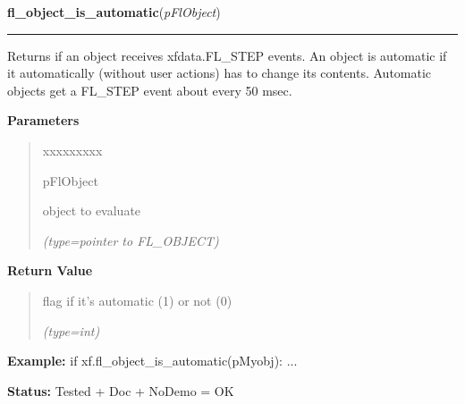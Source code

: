\hspace{.8\funcindent}\begin{boxedminipage}{\funcwidth}

    \raggedright \textbf{fl\_object\_is\_automatic}(\textit{pFlObject})

    \vspace{-1.5ex}

    \rule{\textwidth}{0.5\fboxrule}
\setlength{\parskip}{2ex}
    Returns if an object receives xfdata.FL\_STEP events. An object is 
    automatic if it automatically (without user actions) has to change its 
    contents. Automatic objects get a FL\_STEP event about every 50 msec.

\setlength{\parskip}{1ex}
      \textbf{Parameters}
      \vspace{-1ex}

      \begin{quote}
        \begin{Ventry}{xxxxxxxxx}

          \item[pFlObject]

          object to evaluate

            {\it (type=pointer to FL\_OBJECT)}

        \end{Ventry}

      \end{quote}

      \textbf{Return Value}
    \vspace{-1ex}

      \begin{quote}
      flag if it's automatic (1) or not (0)

      {\it (type=int)}

      \end{quote}

\textbf{Example:} if xf.fl\_object\_is\_automatic(pMyobj): ...



\textbf{Status:} Tested + Doc + NoDemo = OK



    \end{boxedminipage}

    \label{xformslib:flbasic:fl_draw_object_label}

    \vspace{0.5ex}

